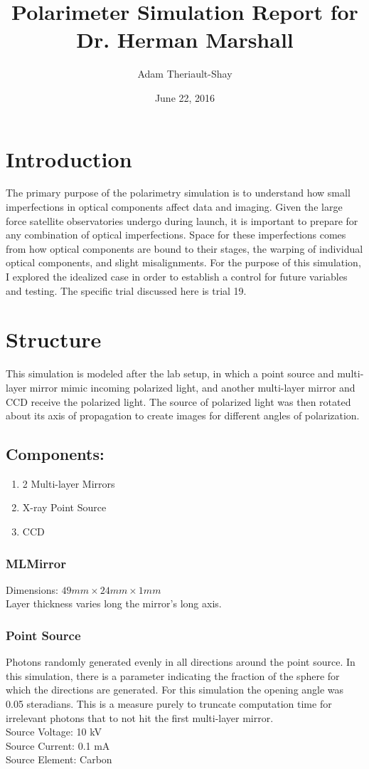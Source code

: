 \documentclass[11pt, oneside]{article}   	%
\title{Polarimeter Simulation Report for Dr. Herman Marshall}
\author{Adam Theriault-Shay}
\date{June 22, 2016}							%
\begin{document}
\maketitle
\section{Introduction}
The primary purpose of the polarimetry simulation is to understand how small imperfections in optical components affect data and imaging. Given the large force satellite observatories undergo during launch, it is important to prepare for any combination of optical imperfections. Space for these imperfections comes from how optical components are bound to their stages, the warping of individual optical components, and slight misalignments.
For the purpose of this simulation, I explored the idealized case in order to establish a control for future variables and testing. The specific trial discussed here is trial 19.
	
\section{Structure}

This simulation is modeled after the lab setup, in which a point source and multi-layer mirror mimic incoming polarized light, and another multi-layer mirror and CCD receive the polarized light. The source of polarized light was then rotated about its axis of propagation to create images for different angles of polarization.
\subsection{Components:}
\begin{enumerate}

\item 2 Multi-layer Mirrors 
\item X-ray Point Source
\item CCD
\end{enumerate}

\subsubsection{MLMirror}
Dimensions: $49mm \times 24mm \times 1mm$\\
Layer thickness varies long the mirror's long axis.

\subsubsection{Point Source}
Photons randomly generated evenly in all directions around the point source. In this simulation, there is a parameter indicating the fraction of the sphere for which the directions are generated. For this simulation the opening angle was 0.05 steradians. This is a measure purely to truncate computation time for irrelevant photons that to not hit the first multi-layer mirror.\\
Source Voltage: 10 kV\\
Source Current: 0.1 mA\\
Source Element: Carbon\\
\end{document}
